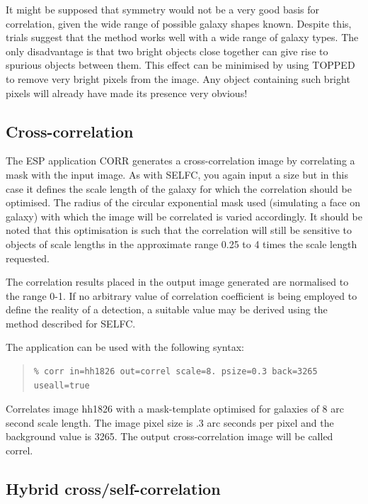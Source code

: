 \documentclass[twoside,11pt]{article}
\newenvironment{myquote}{\begin{quote}\begin{small}}{\end{small}\end{quote}}
\begin{document}
It might be supposed that symmetry would not be a very good basis for correlation,
given the wide range of possible galaxy shapes known. Despite this, 
trials suggest that the method works well with a wide range of galaxy
types. The only disadvantage is that two bright objects close together can
give rise to spurious objects between them. This effect can be minimised by
using TOPPED to remove very bright pixels from the image. Any object containing
such bright pixels will already have made its presence very obvious!

\subsection{Cross-correlation}

The ESP application CORR generates a cross-correlation image by correlating
a mask with the input image. As with SELFC, you again input a size but in 
this case it defines the scale length of the galaxy for which the correlation 
should be optimised. The radius of the circular exponential mask used 
(simulating a face on galaxy) with which the image will be correlated 
is varied accordingly. It should be noted that this optimisation is such that 
the correlation will still be sensitive to objects of scale lengths in the 
approximate range 0.25 to 4 times the scale length requested.

The correlation results placed in the output image generated are 
normalised to the range 0-1. If no arbitrary value 
of correlation coefficient is being employed to define the reality of a detection,
a suitable value may be derived using the method described for SELFC. 

The application can be used with the following syntax:

\begin{myquote}
\begin{verbatim}
% corr in=hh1826 out=correl scale=8. psize=0.3 back=3265 useall=true
\end{verbatim}
\end{myquote}

Correlates image hh1826 with a mask-template optimised for galaxies of 
8 arc second scale length. The image pixel size is .3 arc seconds 
per pixel and the background value is 3265. The 
output cross-correlation image will be called correl.

\subsection{Hybrid cross/self-correlation}
\end{document}
